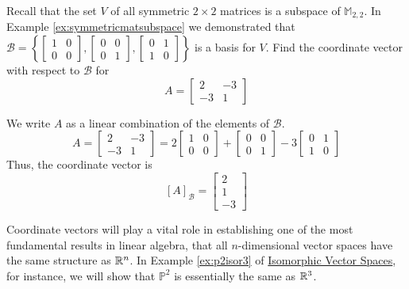 \documentclass{ximera}
\begin{document}
\begin{example}\label{ex:symmmatsubspace}
Recall that the set $V$ of all symmetric $2\times 2$ matrices is a subspace of $\mathbb{M}_{2,2}$.  In Example \ref{ex:symmetricmatsubspace} we demonstrated that $\mathcal{B} = \left\{
\begin{bmatrix}
1 & 0 \\
0 & 0
\end{bmatrix}, \begin{bmatrix}
0 & 0 \\
0 & 1
\end{bmatrix}, \begin{bmatrix}
0 & 1 \\
1 & 0
\end{bmatrix}
\right\}$ is a basis for $V$.  Find the coordinate vector with respect to $\mathcal{B}$ for 
$$A=\begin{bmatrix}2&-3\\-3&1\end{bmatrix}$$
\begin{explanation}
We write $A$ as a linear combination of the elements of $\mathcal{B}$.
$$A=\begin{bmatrix}2&-3\\-3&1\end{bmatrix}=2\begin{bmatrix}1&0\\0&0\end{bmatrix}+\begin{bmatrix}
0 & 0 \\
0 & 1
\end{bmatrix}-3\begin{bmatrix}
0 & 1 \\
1 & 0
\end{bmatrix}$$
Thus, the coordinate vector is
$$[A]_{\mathcal{B}}=\begin{bmatrix}2\\1\\-3\end{bmatrix}$$
\end{explanation}
\end{example}


Coordinate vectors will play a vital role in establishing one of the most fundamental results in linear algebra, that all $n$-dimensional vector spaces have the same structure as $\mathbb{R}^n$.  In Example \ref{ex:p2isor3} of \href{https://ximera.osu.edu/oerlinalg/LinearAlgebra/LTR-0060/main}{Isomorphic Vector Spaces}, for instance, we will show that $\mathbb{P}^2$ is essentially the same as $\mathbb{R}^3$.  
\end{document}
